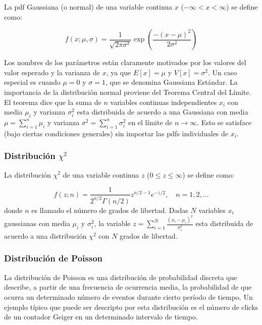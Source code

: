 La pdf Gaussiana (o normal) de una variable continua $x$ ($-\infty < x < \infty$)
se define como:

\begin{equation}
  f(x;\mu,\sigma) = \frac{1}{\sqrt{2\pi \sigma^2}} \exp \left( \frac{-(x-\mu)^2}{2\sigma^2} \right)
\end{equation}

Los nombres de los parámetros están claramente motivados por los valores del
valor esperado y la varianza de $x$, ya que $E[x] = \mu$ y $V[x] = \sigma^2$. Un
caso especial es cuando $\mu=0$ y $\sigma=1$, que se denomina Gaussiana
Estándar.
La importancia de la distribución normal proviene del Teorema Central del
Límite. El teorema dice que la suma de $n$ variables continuas independientes
$x_i$ con media $\mu_i$ y varianza $\sigma_i^2$ esta distribuida de acuerdo a
una Gaussiana con media $\mu = \sum_{i=1}^n \mu_i$ y varianza $\sigma^2 =
\sum_{i=1}^n \sigma_i^2$ en el límite de $n\to\infty$. Esto se satisface (bajo
ciertas condiciones generales) sin importar las pdfs individuales de $x_i$.


\subsubsection{Distribución $\chi^2$}

La distribución $\chi^2$ de una variable continua $z$ ($0 \leq z \leq \infty$) se
define como:

\begin{equation}
  f(z;n) = \frac{1}{2^{n/2}\Gamma(n/2)} z^{n/2-1} e^{-z/2}, \quad n=1,2,\ldots
\end{equation}
%
donde $n$ es llamado el número de grados de libertad.
Dadas $N$ variables $x_i$ gaussianas con media $\mu_i$ y $\sigma_i^2$, la
variable $z = \sum_{i=1}^{N} \frac{(x_i-\mu_i)^2}{\sigma_i^2}$ esta distribuida
de acuerdo a una distribución $\chi^2$ con $N$ grados de libertad.


\subsubsection{Distribución de Poisson}

La distribución de Poisson es una distribución de probabilidad discreta que
describe, a partir de una frecuencia de ocurrencia media, la probabilidad de que
ocurra un determinado número de eventos durante cierto período de tiempo. Un
ejemplo típico que puede ser descripto por esta distribución es el número de
clicks de un contador Geiger en un determinado intervalo de tiempo.

